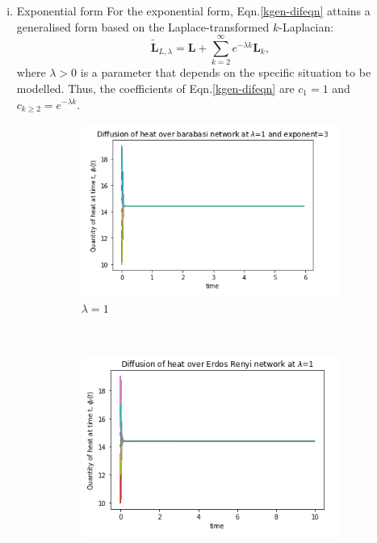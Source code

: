\documentclass[10pt,a4paper]{article}
\begin{document}
    	        \begin{enumerate}[i)]
    	    	\item Exponential form
    	    	For the exponential form, Eqn.\ref{kgen-difeqn} attains a generalised form based on the Laplace-transformed $k$-Laplacian:
    	    	\begin{equation}
    	    	\tilde{\mathbf{L}}_{L,\lambda} = \mathbf{L} + \sum_{k=2}^{\infty} e^{-\lambda k} \mathbf{L}_k, 
    	    	\label{laplacetransform}
    	    	\end{equation}
    	    	where $\lambda >0$ is a parameter that depends on the specific situation to be modelled.
    	    	Thus, the coefficients of Eqn.\ref{kgen-difeqn} are $c_1 = 1$ and $c_{k \geq 2} = e^{-\lambda k}$.
    	    	
    	    	\begin{figure}[H]
    	    		\centering
    	    		\begin{subfigure}[b]{0.45\textwidth}
    	    			\includegraphics[width=\textwidth]{images/BA-lam1-laplace.png}
    	    			\caption{$\lambda=1$}
    	    		\end{subfigure}~
    	    		\begin{subfigure}[b]{0.45\textwidth}
    	    			\includegraphics[width= \textwidth]{images/ER-lam1-laplace.png}

\end{subfigure}
\end{figure}
\end{enumerate}
\end{document}
